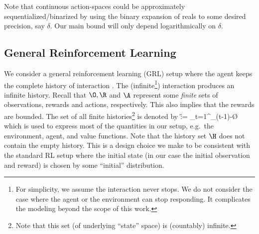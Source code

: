 \documentclass{article} %
\begin{document}
Note that continuous action-spaces could be approximately sequentialized/binarized by using the binary expansion of reals to some desired precision, say $\delta$. Our main bound will only depend logarithmically on $\delta$.

\subsection{General Reinforcement Learning}

We consider a general reinforcement learning (GRL) setup where the agent keeps the complete history of interaction \cite{Hutter2009}. The (infinite\footnote{For simplicity, we assume the interaction never stops. We do not consider the case where the agent or the environment can stop responding. It complicates the modeling beyond the scope of this work.}) interaction produces an infinite history. Recall that $\O, \R$ and $\A$ represent some \emph{finite} sets of observations, rewards and actions, respectively. This also implies that the rewards are bounded. The set of all finite histories\footnote{Note that this set (of underlying ``state'' space) is (countably) infinite.} is denoted by
\beq\label{eq:history}
\H := \bigcup_{t=1}^\infty \underbrace{\O \times \R \times \A \times \dots \times \O \times \R \times \A}_{(t-1)-}\times\O\times\R
\eeq
which is used to express most of the quantities in our setup, e.g.\ the environment, agent, and value functions. Note that the history set $\H$ does not contain the empty history. This is a design choice we make to be consistent with the standard RL setup \cite{Sutton2018} where the initial state (in our case the initial observation and reward) is chosen by some ``initial'' distribution.
\end{document}
